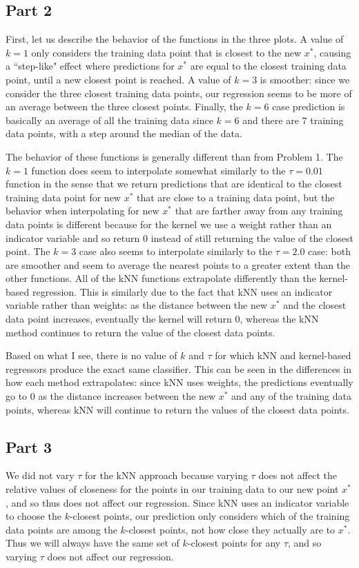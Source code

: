 \documentclass[submit]{harvardml}
\begin{document}
\subsection{Part 2}

First, let us describe the behavior of the functions in the three plots. A value of $k = 1$ only considers the training data point that is closest to the new $x^*$, causing a ``step-like" effect where predictions for $x^*$ are equal to the closest training data point, until a new closest point is reached. A value of $k = 3$ is smoother: since we consider the three closest training data points, our regression seems to be more of an average between the three closest points. Finally, the $k = 6$ case prediction is basically an average of all the training data since $k = 6$ and there are $7$ training data points, with a step around the median of the data.

The behavior of these functions is generally different than from Problem 1. The $k = 1$ function does seem to interpolate somewhat similarly to the $\tau = 0.01$ function in the sense that we return predictions that are identical to the closest training data point for new $x^*$ that are close to a training data point, but the behavior when interpolating for new $x^*$ that are farther away from any training data points is different because for the kernel we use a weight rather than an indicator variable and so return $0$ instead of still returning the value of the closest point. The $k = 3$ case also seems to interpolate similarly to the $\tau = 2.0$ case: both are smoother and seem to average the nearest points to a greater extent than the other functions. All of the kNN functions extrapolate differently than the kernel-based regression. This is similarly due to the fact that kNN uses an indicator variable rather than weights: as the distance between the new $x^*$ and the closest data point increases, eventually the kernel will return $0$, whereas the kNN method continues to return the value of the closest data points.

Based on what I see, there is no value of $k$ and $\tau$ for which kNN and kernel-based regressors produce the exact same classifier. This can be seen in the differences in how each method extrapolates: since kNN uses weights, the predictions eventually go to $0$ as the distance increases between the new $x^*$ and any of the training data points, whereas kNN will continue to return the values of the closest data points.

\subsection{Part 3}
We did not vary $\tau$ for the kNN approach because varying $\tau$ does not affect the relative values of closeness for the points in our training data to our new point $x^*$, and so thus does not affect our regression. Since kNN uses an indicator variable to choose the $k$-closest points, our prediction only considers which of the training data points are among the $k$-closest points, not how close they actually are to $x^*$. Thus we will always have the same set of $k$-closest points for any $\tau$, and so varying $\tau$ does not affect our regression.
\end{document}
